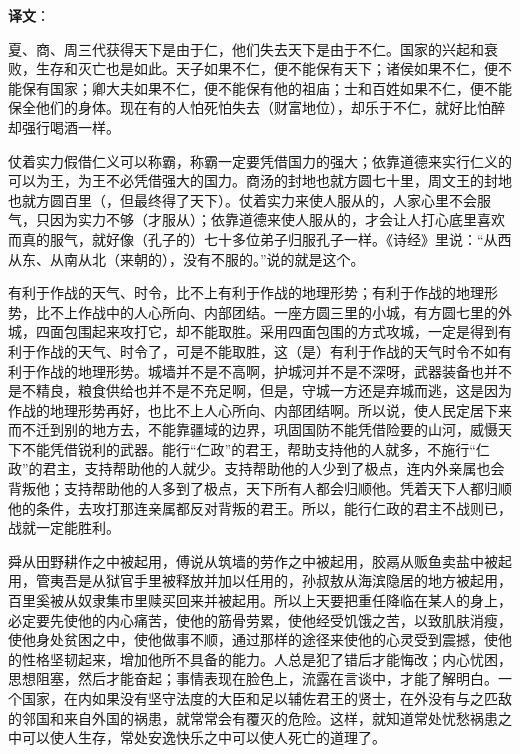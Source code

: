 \documentclass[12pt,UTF-8,openany,a4]{ctexbook}
\begin{document}
\newpage

\begin{Large}
   \noindent \textbf{译文}：
\end{Large}

\vspace{1em}

\begin{large}\yiwen
    
    夏、商、周三代获得天下是由于仁，他们失去天下是由于不仁。国家的兴起和衰败，生存和灭亡也是如此。天子如果不仁，便不能保有天下；诸侯如果不仁，便不能保有国家；卿大夫如果不仁，便不能保有他的祖庙；士和百姓如果不仁，便不能保全他们的身体。现在有的人怕死怕失去（财富地位），却乐于不仁，就好比怕醉却强行喝酒一样。
    
    仗着实力假借仁义可以称霸，称霸一定要凭借国力的强大；依靠道德来实行仁义的可以为王，为王不必凭借强大的国力。商汤的封地也就方圆七十里，周文王的封地也就方圆百里（，但最终得了天下）。仗着实力来使人服从的，人家心里不会服气，只因为实力不够（才服从）；依靠道德来使人服从的，才会让人打心底里喜欢而真的服气，就好像（孔子的）七十多位弟子归服孔子一样。《诗经》里说：“从西从东、从南从北（来朝的），没有不服的。”说的就是这个。
    
    有利于作战的天气、时令，比不上有利于作战的地理形势；有利于作战的地理形势，比不上作战中的人心所向、内部团结。一座方圆三里的小城，有方圆七里的外城，四面包围起来攻打它，却不能取胜。采用四面包围的方式攻城，一定是得到有利于作战的天气、时令了，可是不能取胜，这（是）有利于作战的天气时令不如有利于作战的地理形势。城墙并不是不高啊，护城河并不是不深呀，武器装备也并不是不精良，粮食供给也并不是不充足啊，但是，守城一方还是弃城而逃，这是因为作战的地理形势再好，也比不上人心所向、内部团结啊。所以说，使人民定居下来而不迁到别的地方去，不能靠疆域的边界，巩固国防不能凭借险要的山河，威慑天下不能凭借锐利的武器。能行“仁政”的君王，帮助支持他的人就多，不施行“仁政”的君主，支持帮助他的人就少。支持帮助他的人少到了极点，连内外亲属也会背叛他；支持帮助他的人多到了极点，天下所有人都会归顺他。凭着天下人都归顺他的条件，去攻打那连亲属都反对背叛的君王。所以，能行仁政的君主不战则已，战就一定能胜利。
    
    舜从田野耕作之中被起用，傅说从筑墙的劳作之中被起用，胶鬲从贩鱼卖盐中被起用，管夷吾是从狱官手里被释放并加以任用的，孙叔敖从海滨隐居的地方被起用，百里奚被从奴隶集市里赎买回来并被起用。所以上天要把重任降临在某人的身上，必定要先使他的内心痛苦，使他的筋骨劳累，使他经受饥饿之苦，以致肌肤消瘦，使他身处贫困之中，使他做事不顺，通过那样的途径来使他的心灵受到震撼，使他的性格坚韧起来，增加他所不具备的能力。人总是犯了错后才能悔改；内心忧困，思想阻塞，然后才能奋起；事情表现在脸色上，流露在言谈中，才能了解明白。一个国家，在内如果没有坚守法度的大臣和足以辅佐君王的贤士，在外没有与之匹敌的邻国和来自外国的祸患，就常常会有覆灭的危险。这样，就知道常处忧愁祸患之中可以使人生存，常处安逸快乐之中可以使人死亡的道理了。
    

\end{large}
\end{document}
